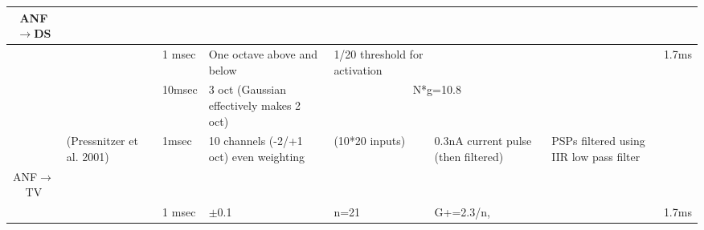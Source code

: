 \begin{longtable}{cXXXXXXX}
 {ANF\ensuremath{\rightarrow}DS}  &                                                  &                                                                                                                    &                                                           &                                           &                                                                                             &                                           & \\\midrule
                                 &          {\citep{ErikssonRobert:1999}}           &                                                     {1 msec }                                                      &               {One octave above and below }               &     {1/20 threshold for activation }      &                                                                                             &                                           & 1.7ms \\
                                 &            {\citep{ReissYoung:2005}}             &                                                      {10msec}                                                      &        {3 oct (Gaussian effectively makes 2 oct)}         &                                                      \multicolumn{2}{c}{N*g=10.8}                                                       &                    {}                     & \\ 
                                 &           {(Pressnitzer et al. 2001)}            &                                                      {1msec}                                                       &         {10 channels (-2/+1 oct) even weighting }         &              (10*20 inputs)               &                            {0.3nA current pulse (then filtered)}                            & {PSPs filtered using IIR low pass filter} & \\ 
 ANF\ensuremath{\rightarrow}TV   &                                                  &                                                                                                                    &                                                           &                                           &                                                                                             &                                           & \\\midrule
                                 &           \citep{ErikssonRobert:1999}            &                                                       1 msec                                                       &                         $\pm$0.1                          &                   n=21                    &                                          G+=2.3/n,                                          &                                           & 1.7ms\\ 

\end{longtable}
